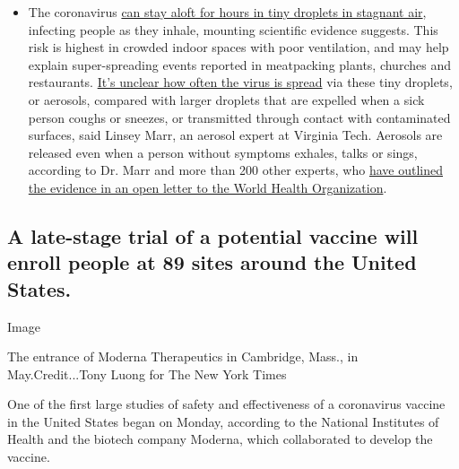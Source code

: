\begin{itemize}
  \begin{itemize}
  \tightlist
  \item
    The coronavirus
    \href{https://www.nytimes3xbfgragh.onion/2020/07/04/health/239-experts-with-one-big-claim-the-coronavirus-is-airborne.html?action=click\&pgtype=Article\&state=default\&region=MAIN_CONTENT_3\&context=storylines_faq}{can
    stay aloft for hours in tiny droplets in stagnant air}, infecting
    people as they inhale, mounting scientific evidence suggests. This
    risk is highest in crowded indoor spaces with poor ventilation, and
    may help explain super-spreading events reported in meatpacking
    plants, churches and restaurants.
    \href{https://www.nytimes3xbfgragh.onion/2020/07/06/health/coronavirus-airborne-aerosols.html?action=click\&pgtype=Article\&state=default\&region=MAIN_CONTENT_3\&context=storylines_faq}{It's
    unclear how often the virus is spread} via these tiny droplets, or
    aerosols, compared with larger droplets that are expelled when a
    sick person coughs or sneezes, or transmitted through contact with
    contaminated surfaces, said Linsey Marr, an aerosol expert at
    Virginia Tech. Aerosols are released even when a person without
    symptoms exhales, talks or sings, according to Dr. Marr and more
    than 200 other experts, who
    \href{https://academic.oup.com/cid/article/doi/10.1093/cid/ciaa939/5867798}{have
    outlined the evidence in an open letter to the World Health
    Organization}.
  \end{itemize}
\end{itemize}

\hypertarget{a-late-stage-trial-of-a-potential-vaccine-will-enroll-people-at-89-sites-around-the-united-states}{%
\subsection{A late-stage trial of a potential vaccine will enroll people
at 89 sites around the United
States.}\label{a-late-stage-trial-of-a-potential-vaccine-will-enroll-people-at-89-sites-around-the-united-states}}

Image

The entrance of Moderna Therapeutics in Cambridge, Mass., in
May.Credit...Tony Luong for The New York Times

One of the first large studies of safety and effectiveness of a
coronavirus vaccine in the United States began on Monday, according to
the National Institutes of Health and the biotech company Moderna, which
collaborated to develop the vaccine.

